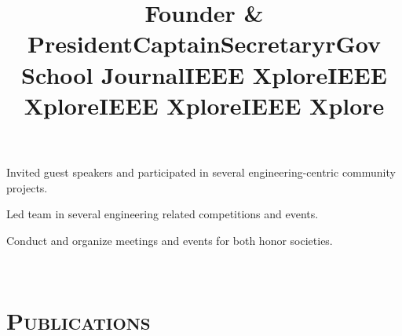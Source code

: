 \begin{resume}
\title{Founder \& President}
\begin{position}
Invited guest speakers and participated in several engineering-centric community projects.
\end{position}

\title{Captain}
\begin{position}
Led team in several engineering related competitions and events.
\end{position}

\title{Secretary}
\begin{position}
Conduct and organize meetings and events for both honor societies.
\end{position}

\begin{formatb}
  \title{r}\\
\end{formatb}

\section{\textsc{Publications}}

\title{Gov School Journal}
\begin{position}
\end{position}

\title{IEEE Xplore}
\begin{position}
\end{position}

\title{IEEE Xplore}
\begin{position}
\end{position}

\title{IEEE Xplore}
\begin{position}
\end{position}

\title{IEEE Xplore}
\begin{position}
\end{position}

\end{resume}

